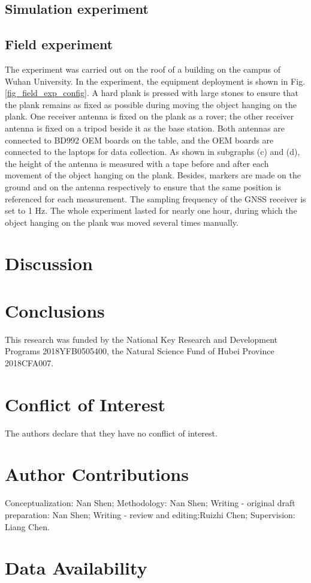 \documentclass{svjour3}                     %
\begin{document}
\subsection{Simulation experiment}


\subsection{Field experiment}
The experiment was carried out on the roof of a building on the campus of Wuhan University. In the experiment, the equipment deployment is shown in Fig. \ref{fig_field_exp_config}. A hard plank is pressed with large stones to ensure that the plank remains as fixed as possible during moving the object hanging on the plank. One receiver antenna is fixed on the plank as a rover; the other receiver antenna is fixed on a tripod beside it as the base station. Both antennas are connected to BD992 OEM boards on the table, and the OEM boards are connected to the laptops for data collection. As shown in subgraphs (c) and (d), the height of the antenna is measured with a tape before and after each movement of the object hanging on the plank. Besides, markers are made on the ground and on the antenna respectively to ensure that the same position is referenced for each measurement. The sampling frequency of the GNSS receiver is set to 1 Hz. The whole experiment lasted for nearly one hour, during which the object hanging on the plank was moved several times manually.

\section{Discussion}


\section{Conclusions}


\begin{acknowledgements}
This research was funded by the National Key Research and Development Programs 2018YFB0505400, the Natural Science Fund of Hubei Province 2018CFA007.
\end{acknowledgements}

%
\section*{Conflict of Interest}
The authors declare that they have no conflict of interest.
\section*{Author Contributions}
Conceptualization: Nan Shen; Methodology: Nan Shen; Writing - original draft preparation: Nan Shen; Writing - review and editing:Ruizhi Chen; Supervision: Liang Chen.
 \section*{Data Availability}



\end{document}

